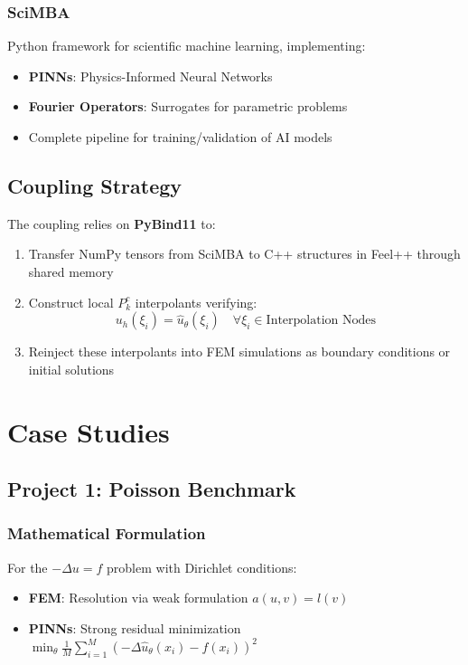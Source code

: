 \documentclass{article}
\begin{document}
\subsubsection{SciMBA}
Python framework for scientific machine learning, implementing:
\begin{itemize}
\item \textbf{PINNs}: Physics-Informed Neural Networks
\item \textbf{Fourier Operators}: Surrogates for parametric problems
\item Complete pipeline for training/validation of AI models
\end{itemize}

\subsection{Coupling Strategy}
The coupling relies on \textbf{PyBind11} to:
\begin{enumerate}
\item Transfer NumPy tensors from SciMBA to C++ structures in Feel++ through shared memory
\item Construct local \( P_k^c \) interpolants verifying:
\[
u_h(\xi_i) = \hat{u}_\theta(\xi_i) \quad \forall \xi_i \in \text{Interpolation Nodes}
\]
\item Reinject these interpolants into FEM simulations as boundary conditions or initial solutions
\end{enumerate}

\section{Case Studies}
\subsection{Project 1: Poisson Benchmark}
\subsubsection{Mathematical Formulation}
For the \( -\Delta u = f \) problem with Dirichlet conditions:
\begin{itemize}
\item \textbf{FEM}: Resolution via weak formulation \( a(u,v) = l(v) \)
\item \textbf{PINNs}: Strong residual minimization \( \min_\theta \frac{1}{M}\sum_{i=1}^M (-\Delta \hat{u}_\theta(x_i) - f(x_i))^2 \)
\end{itemize}
\end{document}
